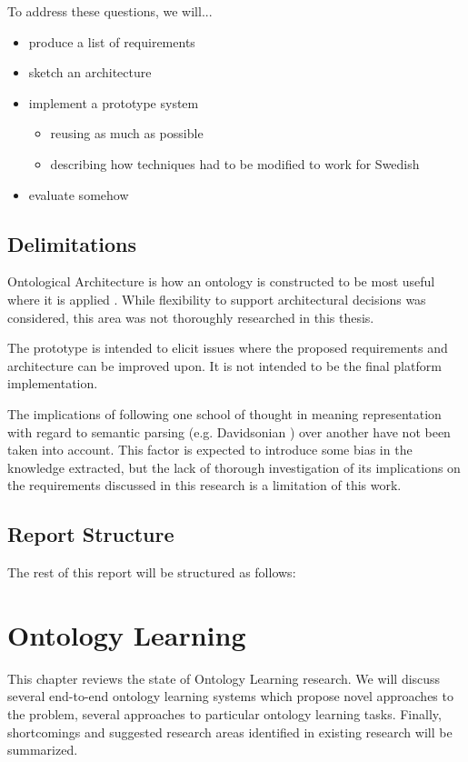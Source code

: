 \documentclass[a4paper]{report}
\begin{document}
To address these questions, we will...

\begin{itemize}
  \item produce a list of requirements
  \item sketch an architecture
  \item implement a prototype system
    \begin{itemize}
      \item reusing as much as possible
      \item describing how techniques had to be modified to work for Swedish
    \end{itemize}
  \item evaluate somehow
\end{itemize}

\section{Delimitations}

Ontological Architecture is how an ontology is constructed to be most useful where it is applied \cite{OntArchChapter}. While flexibility to support architectural decisions was considered, this area was not thoroughly researched in this thesis.

The prototype is intended to elicit issues where the proposed requirements and architecture can be improved upon.
It is not intended to be the final platform implementation.

The implications of following one school of thought in meaning representation with regard to semantic parsing (e.g. Davidsonian \cite{DavidsonianSemantics}) over another have not been taken into account.
This factor is expected to introduce some bias in the knowledge extracted, but the lack of thorough investigation of its implications on the requirements discussed in this research is a limitation of this work.

\section{Report Structure}

The rest of this report will be structured as follows:

\chapter{Ontology Learning}

This chapter reviews the state of Ontology Learning research.
We will discuss several end-to-end ontology learning systems which propose novel approaches to the problem, several approaches to particular ontology learning tasks.
Finally, shortcomings and suggested research areas identified in existing research will be summarized.
\end{document}
